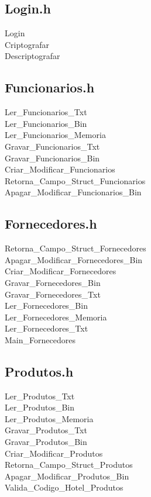 \documentclass[titlepage]{article}
\begin{document}
	\subsection{Login.h}
	Login\\
	Criptografar\\
	Descriptografar\\
	
	\subsection{Funcionarios.h}
	Ler\_Funcionarios\_Txt\\
	Ler\_Funcionarios\_Bin\\
	Ler\_Funcionarios\_Memoria\\
	Gravar\_Funcionarios\_Txt\\
	Gravar\_Funcionarios\_Bin\\
	Criar\_Modificar\_Funcionarios\\
	Retorna\_Campo\_Struct\_Funcionarios\\
	Apagar\_Modificar\_Funcionarios\_Bin\\
	
	\subsection{Fornecedores.h}
	Retorna\_Campo\_Struct\_Fornecedores\\
	Apagar\_Modificar\_Fornecedores\_Bin\\
	Criar\_Modificar\_Fornecedores\\
	Gravar\_Fornecedores\_Bin\\
	Gravar\_Fornecedores\_Txt\\
	Ler\_Fornecedores\_Bin\\
	Ler\_Fornecedores\_Memoria\\
	Ler\_Fornecedores\_Txt\\
	Main\_Fornecedores\\
	
	\subsection{Produtos.h}
	Ler\_Produtos\_Txt\\
	Ler\_Produtos\_Bin\\
	Ler\_Produtos\_Memoria\\
	Gravar\_Produtos\_Txt\\
	Gravar\_Produtos\_Bin\\
	Criar\_Modificar\_Produtos\\
	Retorna\_Campo\_Struct\_Produtos\\
	Apagar\_Modificar\_Produtos\_Bin\\
	Valida\_Codigo\_Hotel\_Produtos\\
	
\end{document}
